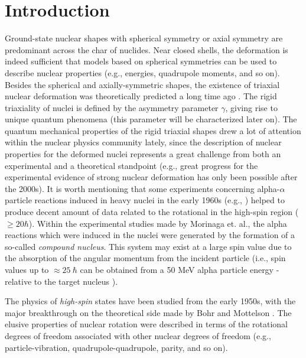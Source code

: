 \chapter{Introduction}

Ground-state nuclear shapes with spherical symmetry or axial symmetry are predominant across the char of nuclides. Near closed shells, the deformation is indeed sufficient that models based on spherical symmetries can be used to describe nuclear properties (e.g., energies, quadrupole moments, and so on). Besides the spherical and axially-symmetric shapes, the existence of triaxial nuclear deformation was theoretically predicted a long time ago \cite{bohr1998nuclear}. The rigid triaxiality of nuclei is defined by the asymmetry parameter $\gamma$, giving rise to unique quantum phenomena (this parameter will be characterized later on). The quantum mechanical properties of the rigid triaxial shapes drew a lot of attention within the nuclear physics community lately, since the description of nuclear properties for the deformed nuclei represents a great challenge from both an experimental and a theoretical standpoint (e.g., great progress for the experimental evidence of strong nuclear deformation has only been possible after the 2000s). It is worth mentioning that some experiments concerning alpha-$\alpha$ particle reactions induced in heavy nuclei in the early 1960s (e.g., \cite{morinaga1963gamma}) helped to produce decent amount of data related to the rotational in the high-spin region ($\geq 20 \hbar$). Within the experimental studies made by Morinaga et. al., the alpha reactions which were induced in the nuclei were generated by the formation of a so-called \emph{compound nucleus}. This system may exist at a large spin value due to the absorption of the angular momentum from the incident particle (i.e., spin values up to $\approx25\ \hbar$ can be obtained from a 50 MeV alpha particle energy - relative to the target nucleus \cite{morinaga1963gamma}).

The physics of \emph{high-spin} states have been studied from the early 1950s, with the major breakthrough on the theoretical side made by Bohr and Mottelson \cite{bohr1998nuclear}. The elusive properties of nuclear rotation were described in terms of the rotational degrees of freedom associated with other nuclear degrees of freedom (e.g., particle-vibration, quadrupole-quadrupole, parity, and so on). 